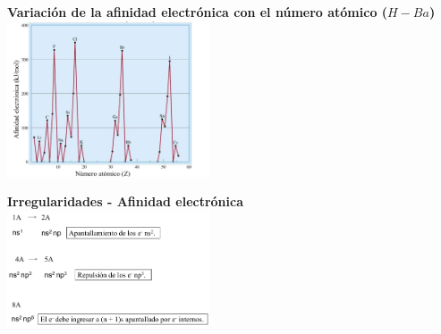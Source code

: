             \begin{center}
                \textbf{Variación de la afinidad electrónica con el número atómico ($H - Ba$)} \\
                \includegraphics[width=6cm]{./imagenes/variacionAfinidadElectronicaNumeroAtomico.png}
            \end{center}

            \begin{center}
                \textbf{Irregularidades - Afinidad electrónica} \\
                \includegraphics[width=6cm]{./imagenes/irregularidadesAfinidadElectronica.png}
            \end{center}
            

